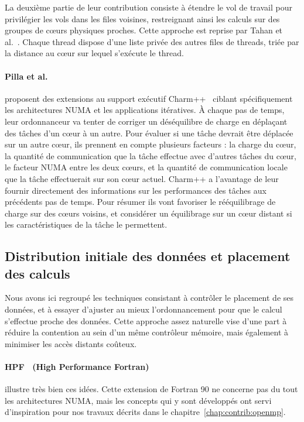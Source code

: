 La deuxième partie de leur contribution consiste à étendre le vol de travail pour privilégier les vols dans les files voisines, restreignant ainsi les calculs sur des groupes de cœurs physiques proches.
Cette approche est reprise par Tahan et al.~\cite{Tahan2014}. Chaque thread dispose d'une liste privée des autres files de threads, triée par la distance au cœur sur lequel s'exécute le thread.



\paragraph{Pilla et al.~\cite{Pilla2014}} proposent des extensions au support exécutif Charm++~\cite{Kale1993} ciblant spécifiquement les architectures NUMA et les applications itératives.
À chaque pas de temps, leur ordonnanceur va tenter de corriger un déséquilibre de charge en déplaçant des tâches d'un cœur à un autre.
Pour évaluer si une tâche devrait être déplacée sur un autre cœur, ils prennent en compte plusieurs facteurs : la charge du cœur, la quantité de communication que la tâche effectue avec d'autres tâches du cœur, le facteur NUMA entre les deux cœurs, et la quantité de communication locale que la tâche effectuerait sur son cœur actuel.
Charm++ a l'avantage de leur fournir directement des informations sur les performances des tâches aux précédents pas de temps.
Pour résumer ils vont favoriser le rééquilibrage de charge sur des cœurs voisins, et considérer un équilibrage sur un cœur distant si les caractéristiques de la tâche le permettent.


\subsection{Distribution initiale des données et placement des calculs}

Nous avons ici regroupé les techniques consistant à contrôler le placement de ses données, et à essayer d'ajuster au mieux l'ordonnancement pour que le calcul s'effectue proche des données.
Cette approche assez naturelle vise d'une part à réduire la contention au sein d'un même contrôleur mémoire, mais également à minimiser les accès distants coûteux.

\paragraph{HPF~\cite{HPF} (High Performance Fortran)} illustre très bien ces idées.
Cette extension de Fortran 90 ne concerne pas du tout les architectures NUMA, mais les concepts qui y sont développés ont servi d'inspiration pour nos travaux décrits dans le chapitre~\ref{chap:contrib:openmp}.

